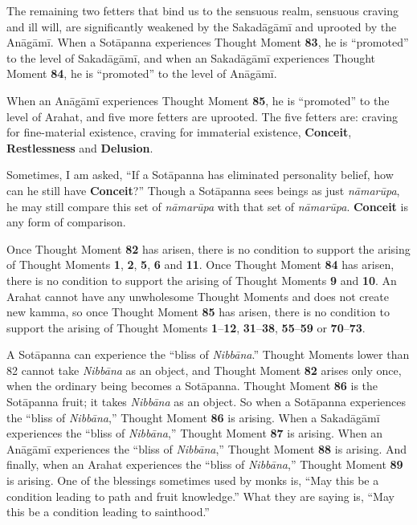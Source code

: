 The remaining two fetters that bind us to the sensuous realm, sensuous craving and ill will, are significantly weakened by the Sakadāgāmī and uprooted by the Anāgāmī. When a Sotāpanna experiences Thought Moment \textbf{83}, he is “promoted” to the level of Sakadāgāmī, and when an Sakadāgāmī experiences Thought Moment \textbf{84}, he is “promoted” to the level of Anāgāmī.

When an Anāgāmī experiences Thought Moment \textbf{85}, he is “promoted” to the level of Arahat, and five more fetters are uprooted. The five fetters are: craving for fine-material existence, craving for immaterial existence, \textbf{Conceit}, \textbf{Restlessness} and \textbf{Delusion}.

Sometimes, I am asked, “If a Sotāpanna has eliminated personality belief, how can he still have \textbf{Conceit}?” Though a Sotāpanna sees beings as just \textit{nāmarūpa}, he may still compare this set of \textit{nāmarūpa} with that set of \textit{nāmarūpa}. \textbf{Conceit} is any form of comparison.

Once Thought Moment \textbf{82} has arisen, there is no condition to support the arising of Thought Moments \textbf{1}, \textbf{2}, \textbf{5}, \textbf{6} and \textbf{11}. Once Thought Moment \textbf{84} has arisen, there is no condition to support the arising of Thought Moments \textbf{9} and \textbf{10}. An Arahat cannot have any unwholesome Thought Moments and does not create new kamma, so once Thought Moment \textbf{85} has arisen, there is no condition to support the arising of Thought Moments \textbf{1}--\textbf{12}, \textbf{31}--\textbf{38}, \textbf{55}--\textbf{59} or \textbf{70}--\textbf{73}.

A Sotāpanna can experience the “bliss of \textit{Nibbāna}.” Thought Moments lower than 82 cannot take \textit{Nibbāna} as an object, and Thought Moment \textbf{82} arises only once, when the ordinary being becomes a Sotāpanna. Thought Moment \textbf{86} is the Sotāpanna fruit; it takes \textit{Nibbāna} as an object. So when a Sotāpanna experiences the “bliss of \textit{Nibbāna},” Thought Moment \textbf{86} is arising. When a Sakadāgāmī experiences the “bliss of \textit{Nibbāna},” Thought Moment \textbf{87} is arising. When an Anāgāmī experiences the “bliss of \textit{Nibbāna},” Thought Moment \textbf{88} is arising. And finally, when an Arahat experiences the “bliss of \textit{Nibbāna},” Thought Moment \textbf{89} is arising. One of the blessings sometimes used by monks is, “May this be a condition leading to path and fruit knowledge.” What they are saying is, “May this be a condition leading to sainthood.”

